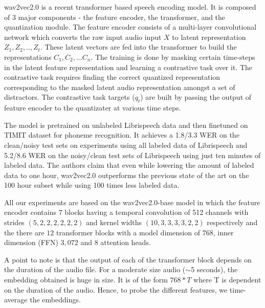 \documentclass[sigconf]{acmart}
\newcommand{\wv}{wav2vec2.0\xspace}
\begin{document}
{\wv} is a recent transformer based speech encoding model. It is composed of 3 major components - the feature encoder, the transformer, and the quantization module. The feature encoder consists of a multi-layer convolutional network which converts the raw input audio input $X$ to latent representation ${Z_{1}, Z_{2},..,Z_{t}}$. These latent vectors are fed into the transformer to build the representations $C_{1},C_{2},...C_{n}$. The training is done by masking certain time-steps in the latent feature representation and learning a contrastive task over it. The contrastive task requires finding the correct quantized representation corresponding to the masked latent audio representation amongst a set of distractors. The contrastive task targets ($q_t$) are built by passing the output of feature encoder to the quantizater at various time steps. 


The model is pretrained on unlabeled Librispeech data \cite{panayotov2015librispeech} and then finetuned on TIMIT \cite{garofolo1993darpa} dataset for phoneme recognition. It achieves a 1.8/3.3 WER on the clean/noisy test sets on experiments using all labeled data of Librispeech and 5.2/8.6 WER on the noisy/clean test sets of Librispeech using just ten minutes of labeled data. The authors claim that even while lowering the amount of labeled data to one hour, \wv outperforms the previous state of the art on the 100 hour subset while using 100 times less labeled data.

All our experiments are based on the \wv-base model in which the feature encoder contains $7$ blocks having a temporal convolution of 512 channels with strides $(5,2,2,2,2,2,2)$ and kernel widths $(10,3,3,3,3,2,2)$ respectively and the there are $12$ transformer blocks with a model dimension of $768$, inner dimension (FFN) $3,072$ and $8$ attention heads.

A point to note is that the output of each of the transformer block depends on the duration of the audio file. For a moderate size audio ($\sim$5 seconds), the embedding obtained is huge in size. It is of the form $768 * T$ where T is dependent on the duration of the audio. Hence, to probe the different features, we time-average the embeddings.

\end{document}
